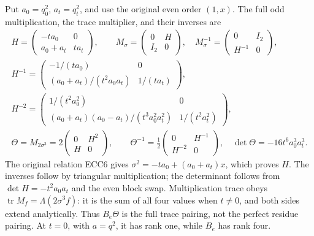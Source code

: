 \documentclass[11pt]{article}
\newcommand{\Tr}{\operatorname{tr}}\newcommand{\Res}{\operatorname{Res}}
\begin{document}
Put $a_0=q_0^2$, $a_t=q_t^2$, and use the original even order $(1,x)$.
The full odd multiplication, the trace multiplier, and their inverses are
\begin{equation}
 \begin{gathered}
 H=\begin{pmatrix}-ta_0&0\\a_0+a_t&ta_t\end{pmatrix},\qquad
 M_\sigma=\begin{pmatrix}0&H\\I_2&0\end{pmatrix},\quad
 M_\sigma^{-1}=\begin{pmatrix}0&I_2\\H^{-1}&0\end{pmatrix},\\
 H^{-1}=\begin{pmatrix}-1/(ta_0)&0\\
 (a_0+a_t)/(t^2a_0a_t)&1/(ta_t)\end{pmatrix},\\
 H^{-2}=\begin{pmatrix}1/(t^2a_0^2)&0\\
 (a_0+a_t)(a_0-a_t)/(t^3a_0^2a_t^2)&1/(t^2a_t^2)\end{pmatrix},\\
 \Theta=M_{2\sigma^3}=2\begin{pmatrix}0&H^2\\H&0\end{pmatrix},\qquad
 \Theta^{-1}=\frac12\begin{pmatrix}0&H^{-1}\\H^{-2}&0\end{pmatrix},\quad
 \det\Theta=-16t^6a_0^3a_t^3.
 \end{gathered}\tag{ECC21}
\end{equation}
The original relation ECC6 gives $\sigma^2=-ta_0+(a_0+a_t)x$,
which proves $H$. The inverses follow by triangular multiplication;
the determinant follows from $\det H=-t^2a_0a_t$ and the even block swap.
Multiplication trace obeys $\Tr M_f=\Lambda(2\sigma^3f)$: it is the sum
of all four values when $t\ne0$, and both sides extend analytically.
Thus $B_e\Theta$ is the full trace pairing, not the perfect residue
pairing. At $t=0$, with $a=q^2$, it has rank one, while $B_e$ has rank four.
\end{document}
